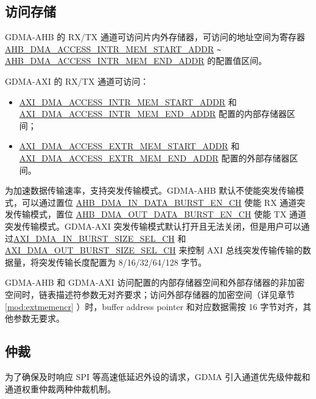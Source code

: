\documentclass[main\_\_CN.tex]{subfiles}
\begin{document}
\subsection{访问存储}\label{sec:dma-access-inter-ram}
GDMA-AHB 的 RX/TX 通道可访问片内外存储器，可访问的地址空间为寄存器 \hyperref[fielddesc:AHBDMAACCESSINTRMEMSTARTADDR]{AHB\_DMA\_ACCESS\_INTR\_MEM\_START\_ADDR} \verb+~+ \hyperref[fielddesc:AHBDMAACCESSINTRMEMENDADDR]{AHB\_DMA\_ACCESS\_INTR\_MEM\_END\_ADDR} 的配置值区间。

GDMA-AXI 的 RX/TX 通道可访问：
\begin{itemize}
    \item \hyperref[fielddesc:AXIDMAACCESSINTRMEMSTARTADDR]{AXI\_DMA\_ACCESS\_INTR\_MEM\_START\_ADDR} 和 \hyperref[fielddesc:AXIDMAACCESSINTRMEMENDADDR]{AXI\_DMA\_ACCESS\_INTR\_MEM\_END\_ADDR} 配置的内部存储器区间；
    \item \hyperref[fielddesc:AXIDMAACCESSEXTRMEMSTARTADDR]{AXI\_DMA\_ACCESS\_EXTR\_MEM\_START\_ADDR} 和\hyperref[fielddesc:AXIDMAACCESSEXTRMEMENDADDR]{AXI\_DMA\_ACCESS\_EXTR\_MEM\_END\_ADDR} 配置的外部存储器区间。
\end{itemize}

为加速数据传输速率，支持突发传输模式。GDMA-AHB 默认不使能突发传输模式，可以通过置位 \hyperref[fielddesc:AHBDMAINDATABURSTENCHN]{AHB\_DMA\_IN\_DATA\_BURST\_EN\_CH} 使能 RX 通道突发传输模式，置位 \hyperref[fielddesc:AHBDMAOUTDATABURSTENCHN]{AHB\_DMA\_OUT\_DATA\_BURST\_EN\_CH} 使能 TX 通道突发传输模式。GDMA-AXI 突发传输模式默认打开且无法关闭，但是用户可以通过\hyperref[fielddesc:AXIDMAINBURSTSIZESELCHN]{AXI\_DMA\_IN\_BURST\_SIZE\_SEL\_CH} 和 \hyperref[fielddesc:AXIDMAOUTBURSTSIZESELCHN]{AXI\_DMA\_OUT\_BURST\_SIZE\_SEL\_CH} 来控制 AXI 总线突发传输传输的数据量，将突发传输长度配置为 8/16/32/64/128 字节。

GDMA-AHB 和 GDMA-AXI 访问配置的内部存储器空间和外部存储器的非加密空间时，链表描述符参数无对齐要求；访问外部存储器的加密空间（详见章节 \ref{mod:extmemencr} \textit{}）时，buffer address pointer 和对应数据需按 16 字节对齐，其他参数无要求。


\subsection{仲裁}

为了确保及时响应 SPI 等高速低延迟外设的请求，GDMA 引入通道优先级仲裁和通道权重仲裁两种仲裁机制。
\end{document}

